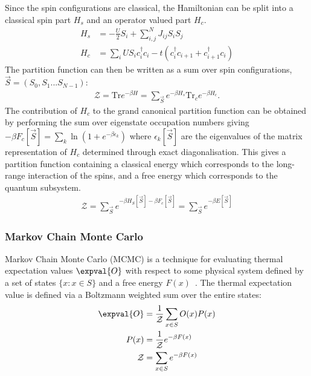 Since the spin configurations are classical, the Hamiltonian can be split into a classical spin part \(H_s\) and an operator valued part \(H_c\). \[\begin{aligned}
H_s& = - \frac{U}{2}S_i + \sum_{i, j}^{N} J_{ij} S_i S_j \\
H_c& = \sum_i U S_i c^\dagger_{i}c_{i} -t(c^\dagger_{i}c_{i+1} + c^\dagger_{i+1}c_{i}) 
\end{aligned}\] The partition function can then be written as a sum over spin configurations, \(\vec{S} = (S_0, S_1...S_{N-1})\): \[\begin{aligned}
\mathcal{Z} = \mathrm{Tr} e^{-\beta H}= \sum_{\vec{S}} e^{-\beta H_s} \mathrm{Tr}_c e^{-\beta H_c} .
\end{aligned}
\] The contribution of \(H_c\) to the grand canonical partition function can be obtained by performing the sum over eigenstate occupation numbers giving \(-\beta F_c[\vec{S}] = \sum_k \ln{(1 + e^{- \beta \epsilon_k})}\) where \({\epsilon_k[\vec{S}]}\) are the eigenvalues of the matrix representation of \(H_c\) determined through exact diagonalisation. This gives a partition function containing a classical energy which corresponds to the long-range interaction of the spins, and a free energy which corresponds to the quantum subsystem. \[\begin{aligned}
\mathcal{Z} = \sum_{\vec{S}} e^{-\beta H_S[\vec{S}] - \beta F_c[\vec{S}]} = \sum_{\vec{S}} e^{-\beta E[\vec{S}]}
\end{aligned}\]

\hypertarget{markov-chain-monte-carlo-1}{%
\subsubsection{Markov Chain Monte Carlo}\label{markov-chain-monte-carlo-1}}

Markov Chain Monte Carlo (MCMC) is a technique for evaluating thermal expectation values \(\expval{O}\) with respect to some physical system defined by a set of states \(\{x: x \in S\}\) and a free energy \(F(x)\)~\autocite{krauthIntroductionMonteCarlo1998}. The thermal expectation value is defined via a Boltzmann weighted sum over the entire states: \[
\begin{aligned}
    \expval{O} &= \frac{1}{\mathcal{Z}} \sum_{x \in S} O(x) P(x) \\
    P(x) &= \frac{1}{\mathcal{Z}} e^{-\beta F(x)} \\
    \mathcal{Z} &= \sum_{x \in S} e^{-\beta F(x)}
\end{aligned}
\]

